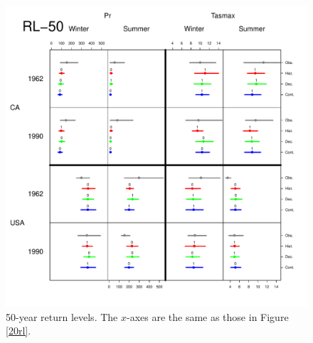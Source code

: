 \begin{figure}
\begin{center}
 \includegraphics[scale=0.61]{figs/rl50.pdf}
\end{center}
\caption{50-year return levels. The $x$-axes are the same as those in Figure \ref{20rl}.}
\label{50rl}
\end{figure}

